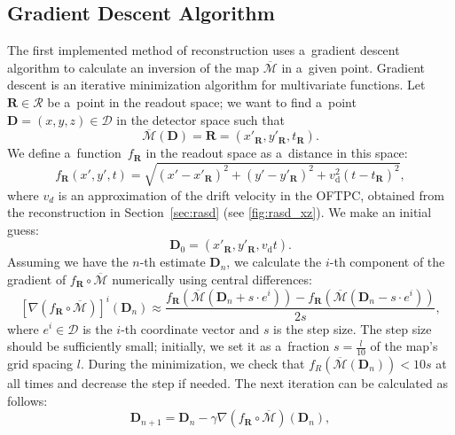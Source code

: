 		\subsection{Gradient Descent Algorithm}
		\label{sec:grad}			
			The first implemented method of reconstruction uses a~gradient descent algorithm to calculate an inversion of the map $\overline{\mathcal{M}}$ in a~given point. Gradient descent is an iterative minimization algorithm for multivariate functions. Let $\mathbf{R}\in\mathcal{R}$ be a~point in the readout space; we want to find a~point $\mathbf{D} = (x,y,z) \in\mathcal{D}$ in the detector space such that 
				\begin{equation}
					\overline{\mathcal{M}}(\mathbf{D}) = \mathbf{R} = (x'_\mathbf{R},y'_\mathbf{R},t_\mathbf{R}).
				\end{equation}
			We define a~function~$f_\mathbf{R}$ in the readout space as a~distance in this space:
				\begin{equation}
					f_\mathbf{R}(x',y',t) = \sqrt{(x'-x'_\mathbf{R})^2+(y'-y'_\mathbf{R})^2+v_\text{d}^2(t-t_\mathbf{R})^2},
				\end{equation}
			where $v_d$ is an approximation of the drift velocity in the \ac{OFTPC}, obtained from the reconstruction in Section~\ref{sec:rasd} (see \cref{fig:rasd_xz}). We make an initial guess:
				\begin{equation}
					\mathbf{D}_0 = (x'_\mathbf{R},y'_\mathbf{R},v_\text{d}t).
				\end{equation}
			Assuming we have the $n$-th estimate $\mathbf{D}_n$, we calculate the $i$-th component of the gradient of $f_\mathbf{R}\circ\overline{\mathcal{M}}$ numerically using central differences:
				\begin{equation}
					\left[\nabla(f_\mathbf{R}\circ\overline{\mathcal{M}})\right]^i(\mathbf{D}_n) \approx \frac{f_\mathbf{R}(\overline{\mathcal{M}}(\mathbf{D}_n+s\cdot e^i))-f_\mathbf{R}(\overline{\mathcal{M}}(\mathbf{D}_n-s\cdot e^i))}{2s},
				\end{equation}
			where $e^i\in\mathcal{D}$ is the $i$-th coordinate vector and $s$ is the step size. The step size should be sufficiently small; initially, we set it as a~fraction $s = \frac{l}{10}$ of the map's grid spacing $l$. During the minimization, we check that $f_R(\overline{\mathcal{M}}(\mathbf{D}_n))<10s$ at all times and decrease the step if needed. The next iteration can be calculated as follows:
				\begin{equation}
					\mathbf{D}_{n+1} = \mathbf{D}_n - \gamma \nabla(f_\mathbf{R}\circ\overline{\mathcal{M}})(\mathbf{D}_n),
				\end{equation}
